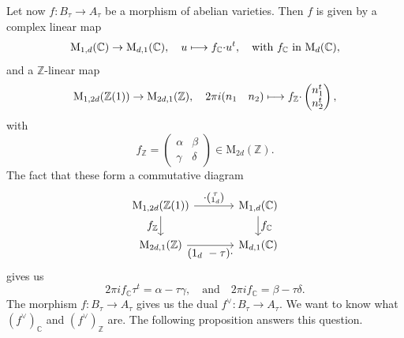 \documentclass[JEP,XML,SOM,Unicode,NoFloatCountersInSection]{cedram}
\def\mto{\mathchoice{\longmapsto}{\mapsto}{\mapsto}{\mapsto}}
\let\oldvee\vee
\renewcommand{\vee}{{\scriptscriptstyle\oldvee}}
\theoremstyle{plain}
\theoremstyle{definition}
\numberwithin{equation}{subsection}
\renewcommand{\C}{\mathbb C}
\newcommand{\Z}{\mathbb Z}
\newcommand{\rmM}{\mathrm{M}}
\begin{document}
Let now $f\colon B_\tau\to A_\tau$ be a morphism of abelian
varieties. Then $f$ is given by a complex linear map
\[
\rmM_{1,d}(\C) \to \rmM_{d,1}(\C),\quad u\mto f_\C{\cdot}u^t,
\quad\text{with $f_\C$ in $\rmM_d(\C)$},
\]
and a $\Z$-linear map
\[
\rmM_{1,2d}(\Z(1)) \to \rmM_{2d,1}(\Z),\quad
2\pi i (\begin{matrix} n_1 & n_2\end{matrix})\mto
f_\Z{\cdot}\begin{pmatrix} n_1^t\\ n_2^t\end{pmatrix},
\]
with
\[
f_\Z =
\begin{pmatrix} \alpha & \beta \\\gamma & \delta\end{pmatrix}
\in\rmM_{2d}(\Z).
\]
The fact that these form a commutative diagram
\[
\begin{tikzcd}[column sep = large]
\rmM_{1,2d}(\Z(1)) \ar[r,"\textstyle{\cdot}(\substack{\tau\\ 1_d})"]
\ar[d,"\textstyle f_\Z"'] & \rmM_{1,d}(\C) \ar[d,"\textstyle f_\C"]\\
\rmM_{2d,1}(\Z)\ar[r, "\textstyle(1_d\ -\tau){\cdot}"'] & \rmM_{d,1}(\C)
\end{tikzcd}
\]
gives us
\begin{equation}\label{eq:fC_andf_Z}
2\pi i f_\C\tau^t = \alpha-\tau\gamma,\quad\text{and}\quad
2\pi i f_\C = \beta-\tau\delta.
\end{equation}
The morphism $f\colon B_\tau\to A_\tau$ gives us the dual
$f^\vee\colon B_\tau\to A_\tau$. We want to know what $(f^\vee)_\C$
and $(f^\vee)_\Z$ are. The following proposition answers this
question.
\end{document}

